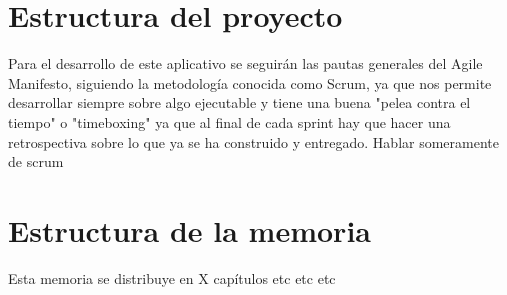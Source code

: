 \documentclass[../pfc.tex]{subfiles}
\begin{document}
\section{Estructura del proyecto}

Para el desarrollo de este aplicativo se seguirán las pautas generales del Agile Manifesto, siguiendo la metodología conocida como Scrum, ya que nos permite desarrollar siempre sobre algo ejecutable y tiene una buena "pelea contra el tiempo" o "timeboxing" ya que al final de cada sprint hay que hacer una retrospectiva sobre lo que ya se ha construido y entregado. Hablar someramente de scrum

\section{Estructura de la memoria}

Esta memoria se distribuye en X capítulos etc etc etc 
\end{document}

